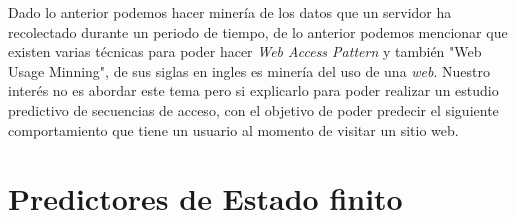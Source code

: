 Dado lo anterior podemos hacer minería de los datos que un servidor ha recolectado durante un periodo de tiempo, de lo anterior  podemos mencionar que existen varias técnicas para poder hacer \emph{Web Access Pattern } y también  "Web Usage Minning", de sus siglas en ingles es minería del uso de una \emph{web}. Nuestro interés no es abordar este tema pero si explicarlo para poder realizar un estudio predictivo de secuencias de acceso, con el objetivo de poder predecir el siguiente comportamiento que tiene un usuario al momento de visitar un sitio web.







\section{Predictores de Estado finito}


